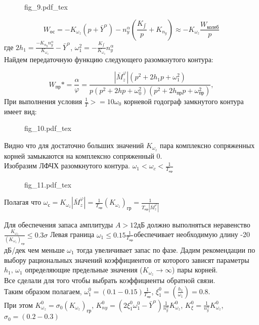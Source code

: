 \documentclass{article}
\begin{document}
\begin{figure}[H]
    \begin{minipage}{\textwidth}
        \centering
        {fig_9.pdf_tex}
    \end{minipage}
\end{figure}


\[
    W_\text{ос} = -K_{\omega_z} (p+\bar{Y}^\alpha) - n_y^\alpha
    (\frac{K_{\int}}{p} + K_{n_y})
    \approx -K_{\omega_z}\frac{W_\text{колеб}}{p}
\]
где $2h_1 = \frac{-K_{n_y} n_y^\alpha}{K_{\omega_z}} - \bar{Y}^\alpha$,
$\omega_1^2 = -\frac{K_{\int}} {K_{\omega_z}} n_y^\alpha $\\
Найдем передаточную функцию следующего разомкнутого контура:

\[
    W_\text{пр}* = {\frac{\alpha}{\varphi}} = \frac{|\bar{M}_z^\varphi| (p^2 +
    2h_1 p + \omega_1^2)} {p(p^2 + 2 hp + \omega_0^2) (p^2 + 2h_\text{пр}p +
    \omega_\text{пр}^2)},
\]
При выполнения условия $\frac{1}{T} >= 10 \omega_0$ корневой годограф
замкнутого контура имеет вид:
\begin{figure}[H]
    \centering
    {fig_10.pdf_tex}
\end{figure}
Видно что для достаточно больших значений $K_{\omega_z}$ пара комплексно
сопряженных корней замыкаются на комплексно сопряженный 0.\\
Изобразим ЛФЧХ разомкнутого контура.
$\omega_1 < \omega_c < \frac{1}{T_\text{пр}}$

\begin{figure}[H]
    \centering
    {fig_11.pdf_tex}
\end{figure}


Полагая что $\omega_\text{с} = K_{\omega_z} | \bar{M}_z^\varphi| =
\frac{1}{T_\text{пр}}
    (K_{\omega_z})_\text{гр} = \frac{1}{T_\text{пр}|\bar{M}_z^\varphi|}$

Для обеспечения запаса амплитуды $A > 12 \text{дБ}$ должно выполняться
неравенство $\frac{K_{\omega_z}}{(K_{\omega_z})_\text{гр}} \leq 0.3 \sigma $
Левая граница $\omega_1 \leq 0.15 \frac{1}{T_\text{пр}}$обеспечивает
необходимую длину -20 дБ/дек чем меньше $\omega_1$ тогда увеличивает запас по
фазе.
Дадим рекомендации по выбору рациональных значений коэффициентов от которого
зависят параметры $h_1, \, \omega_1$ определяющие предельные значения
($K_{\omega_z} \rightarrow\infty$) пары корней.\\
Все сделали для того чтобы выбрать коэффициенты обратной связи. \\
Таким образом полагаем, $\omega_1^0 = (0.1 - 0.15) \frac{1}{T_\text{пр}}$,
$\xi_1^0 = (\frac{h_1}{\omega_1}) = 0.8$.\\
При этом $K_{\omega_z}^0 = \sigma_0 (K_{\omega_z})_\text{гр}$, $K_{ny}^0 =
(2\xi_1^0 \omega_1^0 - \bar{Y}^\alpha) \frac{1}{n_y^\alpha} K_{\omega_z}^0$,
$K_{\xi}^0 = \frac{1}{n_y^\alpha} K_{\omega_z}^0$, $\sigma_0 = (0.2 - 0.3)$
\newpage
\end{document}
